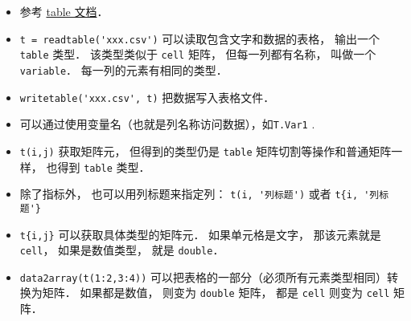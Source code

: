 
\begin{issues}
\issueDraft
\end{issues}

\begin{itemize}
\item 参考 \href{https://www.mathworks.com/help/matlab/tables.html}{table 文档}．
\item \verb|t = readtable('xxx.csv')| 可以读取包含文字和数据的表格， 输出一个 \verb|table| 类型． 该类型类似于 \verb|cell| 矩阵， 但每一列都有名称， 叫做一个 \verb|variable|． 每一列的元素有相同的类型．
\item \verb|writetable('xxx.csv', t)| 把数据写入表格文件．

\item 可以通过使用变量名（也就是列名称访问数据），如\verb|T.Var1| .
\item \verb|t(i,j)| 获取矩阵元， 但得到的类型仍是 \verb|table| 矩阵切割等操作和普通矩阵一样， 也得到 \verb|table| 类型．
\item 除了指标外， 也可以用列标题来指定列： \verb|t(i, '列标题')| 或者 \verb|t{i, '列标题'}|
\item \verb|t{i,j}| 可以获取具体类型的矩阵元． 如果单元格是文字， 那该元素就是 \verb|cell|， 如果是数值类型， 就是 \verb|double|．
\item \verb|data2array(t(1:2,3:4))|  可以把表格的一部分（必须所有元素类型相同）转换为矩阵． 如果都是数值， 则变为 \verb|double| 矩阵， 都是 \verb|cell| 则变为 \verb|cell| 矩阵．
\end{itemize}
